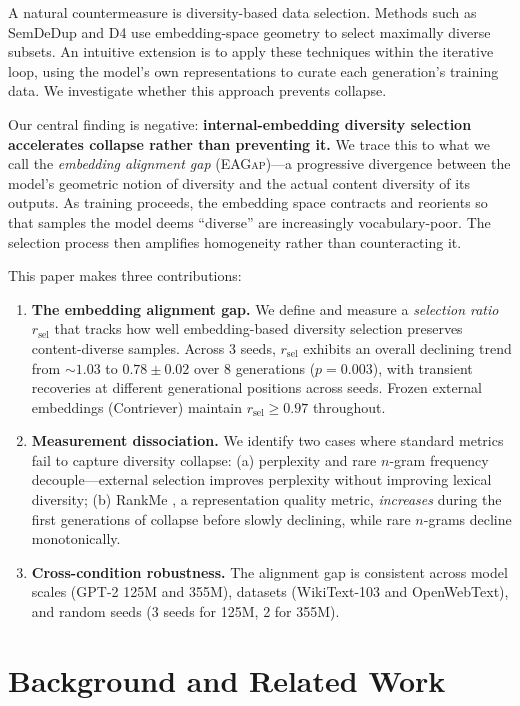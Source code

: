 \documentclass[11pt,a4paper]{article}
\newcommand{\gap}{\textsc{EAGap}}
\newcommand{\ratio}{\ensuremath{r_{\text{sel}}}}
\begin{document}
A natural countermeasure is diversity-based data selection.
Methods such as SemDeDup \cite{abbas2023semdedup} and D4 \cite{tirumala2023d4} use embedding-space geometry to select maximally diverse subsets.
An intuitive extension is to apply these techniques within the iterative loop, using the model's own representations to curate each generation's training data.
We investigate whether this approach prevents collapse.

Our central finding is negative: \textbf{internal-embedding diversity selection accelerates collapse rather than preventing it.}
We trace this to what we call the \emph{embedding alignment gap} (\gap{})---a progressive divergence between the model's geometric notion of diversity and the actual content diversity of its outputs.
As training proceeds, the embedding space contracts and reorients so that samples the model deems ``diverse'' are increasingly vocabulary-poor.
The selection process then amplifies homogeneity rather than counteracting it.

This paper makes three contributions:
\begin{enumerate}
\item \textbf{The embedding alignment gap.}
We define and measure a \emph{selection ratio} $\ratio$ that tracks how well embedding-based diversity selection preserves content-diverse samples.
Across 3 seeds, $\ratio$ exhibits an overall declining trend from ${\sim}1.03$ to $0.78 \pm 0.02$ over 8 generations ($p{=}0.003$), with transient recoveries at different generational positions across seeds.
Frozen external embeddings (Contriever) maintain $\ratio \geq 0.97$ throughout.

\item \textbf{Measurement dissociation.}
We identify two cases where standard metrics fail to capture diversity collapse:
(a) perplexity and rare $n$-gram frequency decouple---external selection improves perplexity without improving lexical diversity;
(b) RankMe \cite{garrido2023rankme}, a representation quality metric, \emph{increases} during the first generations of collapse before slowly declining, while rare $n$-grams decline monotonically.

\item \textbf{Cross-condition robustness.}
The alignment gap is consistent across model scales (GPT-2 125M and 355M), datasets (WikiText-103 and OpenWebText), and random seeds (3 seeds for 125M, 2 for 355M).
\end{enumerate}

\section{Background and Related Work}
\end{document}
